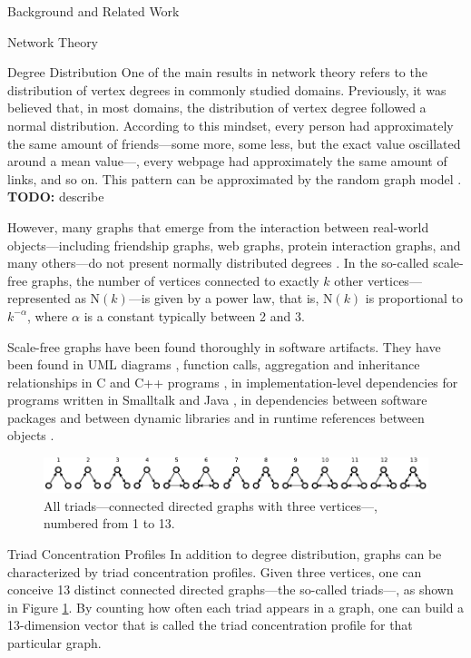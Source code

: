 \documentclass[11pt,twocolumn,a4paper,english]{article}
\newcommand{\TODO}{\textbf{TODO:} }
\begin{document}
\begin{section}{Background and Related Work}
\begin{subsection}{Network Theory}
\begin{subsubsection}{Degree Distribution}
	One of the main results in network theory refers to the distribution of vertex degrees in commonly studied domains. Previously, it was believed that, in most domains, %
the distribution of vertex degree followed a normal distribution.%
According to this mindset, every person had approximately the same amount of friends---some more, some less, but the exact value oscillated around a mean value---, every webpage had approximately the same amount of links, and so on. 
%	
	This pattern can be approximated by the random graph model \cite{Erdos1959}. \TODO describe
	
	However, %
	many graphs that emerge from the interaction between real-world objects---including friendship graphs, web graphs, protein interaction graphs, and many others---do not present normally distributed degrees \cite{Newman2003}. In the so-called scale-free graphs, the number of vertices connected to exactly $k$ other vertices---represented as $\mathrm{N}(k)$---is given by a power law, that is, $\mathrm{N}(k)$ is proportional to $k^{-\alpha}$, where $\alpha$ is a constant typically between 2 and 3.
	
	Scale-free graphs have been found thoroughly in software artifacts. They have been found in UML diagrams \cite{Valverde2003}, function calls, aggregation and inheritance relationships in C and C++ programs \cite{Myers2003}, in implementation-level dependencies for programs written in Smalltalk and Java \cite{Marchesi2004,Concas2007,Hyland-Wood2006,Baxter2006,Ichii2008}, in dependencies between software packages \cite{Labelle2004} and between dynamic libraries \cite{Louridas2008} and in runtime references between objects \cite{Potanin2005}.	
\end{subsubsection}

	\begin{figure}[tbp]
		\centering
			\includegraphics[scale=1]{figures/triads}
		\caption{All triads---connected directed graphs with three vertices---, numbered from 1 to 13.}
		\label{fig:triads}
	\end{figure}
	
\begin{subsubsection}{Triad Concentration Profiles}
	In addition to degree distribution, graphs can be characterized by triad concentration profiles. Given three vertices, one can conceive 13 distinct connected directed graphs---the so-called triads---, as shown in Figure \ref{fig:triads}. By counting how often each triad appears in a graph, one can build a 13-dimension vector that is called the triad concentration profile for that particular graph. %


\end{subsubsection}
\end{subsection}
\end{section}
\end{document}
